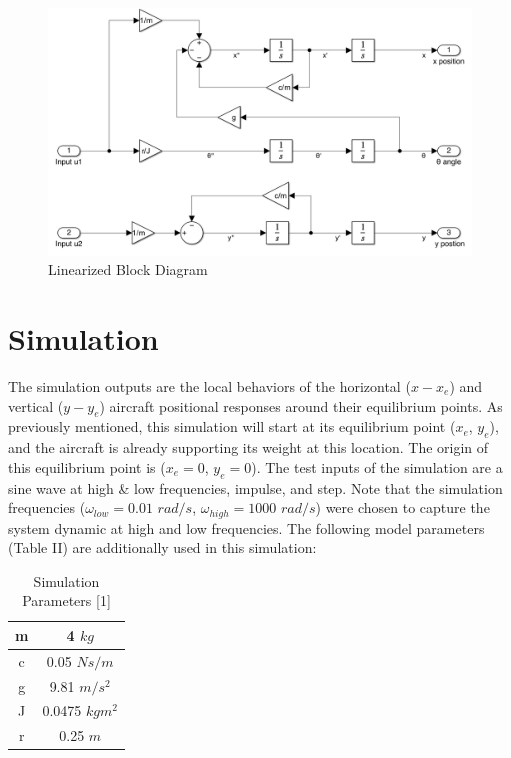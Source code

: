 \documentclass[conference]{IEEEtran}
\begin{document}
\begin{figure}[htbp!]
\centerline{\includegraphics[scale=0.3]{LinearBlock.png}}
\caption{Linearized Block Diagram}
\label{figure}
\end{figure}

\section{Simulation}
The simulation outputs are the local behaviors of the horizontal ($x - x_e$) and vertical ($y - y_e$) aircraft positional responses around their equilibrium points. As previously mentioned, this simulation will start at its equilibrium point ($x_e$, $y_e$), and the aircraft is already supporting its weight at this location. The origin of this equilibrium point is ($x_e = 0$, $y_e = 0$). The test inputs of the simulation are a sine wave at high \& low frequencies, impulse, and step. Note that the simulation frequencies ($\omega_{low} = 0.01$ $rad/s$, $\omega_{high} = 1000$ $rad/s$) were chosen to capture the system dynamic at high and low frequencies. The following model parameters (Table II) are additionally used in this simulation:\\
\begin{table}[h]
\begin{center}
\caption{Simulation Parameters [1]}
\label{thelabel}
\begin{tabular}{ |c|c| } 
\hline
m	& 4	$kg$\\
\hline
c	&0.05 $Ns/m$\\
\hline
g	 &9.81 $m/s^2$\\
\hline
J	&0.0475	$kgm^2$\\
\hline
r&	0.25 $m$\\
\hline
\end{tabular}
\end{center}

\end{table}
\end{document}
